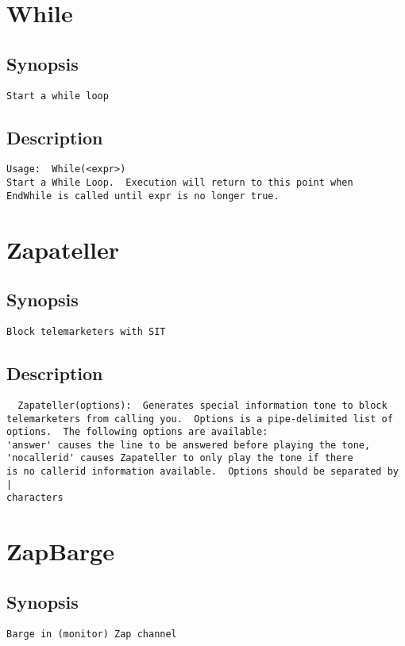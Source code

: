 \section{While}
\subsection{Synopsis}
\begin{verbatim}
Start a while loop
\end{verbatim}
\subsection{Description}
\begin{verbatim}
Usage:  While(<expr>)
Start a While Loop.  Execution will return to this point when
EndWhile is called until expr is no longer true.

\end{verbatim}


\section{Zapateller}
\subsection{Synopsis}
\begin{verbatim}
Block telemarketers with SIT
\end{verbatim}
\subsection{Description}
\begin{verbatim}
  Zapateller(options):  Generates special information tone to block
telemarketers from calling you.  Options is a pipe-delimited list of
options.  The following options are available:
'answer' causes the line to be answered before playing the tone,
'nocallerid' causes Zapateller to only play the tone if there
is no callerid information available.  Options should be separated by |
characters

\end{verbatim}


\section{ZapBarge}
\subsection{Synopsis}
\begin{verbatim}
Barge in (monitor) Zap channel
\end{verbatim}
